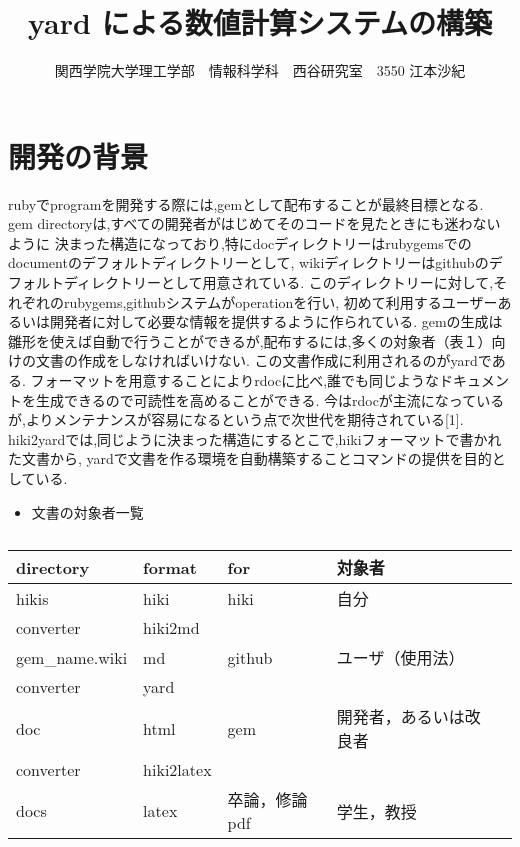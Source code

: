 \documentclass[10pt,a4j,twocolumn]{jsarticle}
\begin{document}
\title{yard による数値計算システムの構築}
\author{関西学院大学理工学部　情報科学科　西谷研究室　3550 江本沙紀}
\date{}
\maketitle
\section{開発の背景}
rubyでprogramを開発する際には,gemとして配布することが最終目標となる.
gem directoryは,すべての開発者がはじめてそのコードを見たときにも迷わないように
決まった構造になっており,特にdocディレクトリーはrubygemsでのdocumentのデフォルトディレクトリーとして,
wikiディレクトリーはgithubのデフォルトディレクトリーとして用意されている.
このディレクトリーに対して,それぞれのrubygems,githubシステムがoperationを行い,
初めて利用するユーザーあるいは開発者に対して必要な情報を提供するように作られている.
gemの生成は雛形を使えば自動で行うことができるが,配布するには,多くの対象者（表１）向けの文書の作成をしなければいけない.
この文書作成に利用されるのがyardである.
フォーマットを用意することによりrdocに比べ,誰でも同じようなドキュメントを生成できるので可読性を高めることができる.
今はrdocが主流になっているが,よりメンテナンスが容易になるという点で次世代を期待されている[1].
hiki2yardでは,同じように決まった構造にするとこで,hikiフォーマットで書かれた文書から,
yardで文書を作る環境を自動構築することコマンドの提供を目的としている.
\begin{itemize}
\item 文書の対象者一覧
\end{itemize}
\begin{table}[htbp]\begin{center}
\caption{}
\begin{tabular}{lllll}
\hline
directory  &format  &for   &対象者  \\ \hline
hikis   &hiki   &hiki   &自分  \\
converter   &hiki2md  \\
gem\_name.wiki   &md   &github  &ユーザ（使用法）  \\
converter   &yard  \\
doc   &html   &gem   &開発者，あるいは改良者  \\
converter   &hiki2latex  \\
docs   &latex   &卒論，修論pdf   &学生，教授  \\
\hline
\end{tabular}
\label{default}
\end{center}\end{table}
\end{document}

